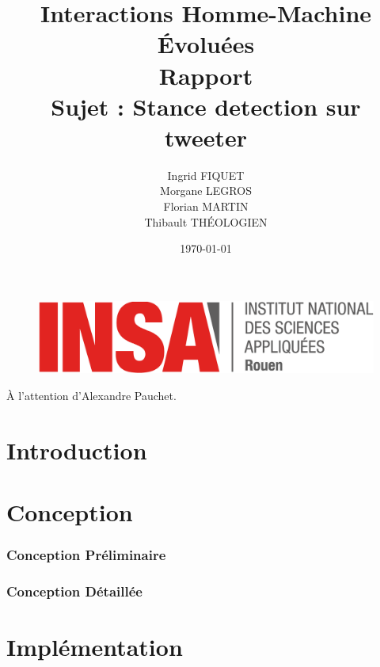 \documentclass[a4paper,12pt]{article}
\title{\huge Interactions Homme-Machine Évoluées\\Rapport\\Sujet : Stance detection sur tweeter}
\author{Ingrid FIQUET\\Morgane LEGROS\\Florian MARTIN\\Thibault THÉOLOGIEN}
\date{\today}
\begin{document}
	\begin{titlepage}
		\vfill
		\begin{figure}
			\includegraphics[scale=0.3]{img/logoINSARouen.png}
		\end{figure}

		\maketitle


    \begin{center}
    \LARGE
      \addvspace{10mm}
      À l'attention d'Alexandre Pauchet.
    \end{center}

		\vfill
		\noindent \hrulefill

	\end{titlepage}



\newpage
\tableofcontents{}

\newpage
\part{Introduction}
	


\newpage
\part{Conception}

\section{Conception Préliminaire}
	


\section{Conception Détaillée}
	


\newpage
\part{Implémentation}
	
	
\end{document}
